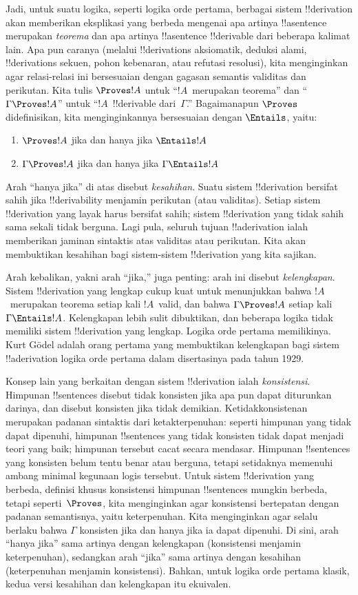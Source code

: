 \documentclass[../../../include/open-logic-section]{subfiles}
\begin{document}
Jadi, untuk suatu logika, seperti logika orde pertama, berbagai sistem
!!{derivation} akan memberikan eksplikasi yang berbeda mengenai apa
artinya !!a{sentence} merupakan \emph{teorema} dan apa artinya
!!a{sentence} !!{derivable} dari beberapa kalimat lain. Apa pun
caranya (melalui !!{derivation}s aksiomatik, deduksi alami,
!!{derivation}s sekuen, pohon kebenaran, atau refutasi resolusi), kita
menginginkan agar relasi-relasi ini bersesuaian dengan gagasan
semantis validitas dan perikutan. Kita tulis $\Proves !A$ untuk
``$!A$~merupakan teorema'' dan ``$\Gamma \Proves !A$'' untuk
``$!A$~!!{derivable} dari~$\Gamma$.'' Bagaimanapun $\Proves$~
didefinisikan, kita menginginkannya bersesuaian dengan $\Entails$,
yaitu:
\begin{enumerate}
\item $\Proves !A$ jika dan hanya jika $\Entails !A$
\item $\Gamma \Proves !A$ jika dan hanya jika $\Gamma \Entails !A$
\end{enumerate}
Arah ``hanya jika'' di atas disebut \emph{kesahihan}.
Suatu sistem !!{derivation} bersifat sahih jika !!{derivability} menjamin
perikutan (atau validitas). Setiap sistem !!{derivation} yang layak
harus bersifat sahih; sistem !!{derivation} yang tidak sahih sama
sekali tidak berguna. Lagi pula, seluruh tujuan !!a{derivation} ialah
memberikan jaminan sintaktis atas validitas atau perikutan. Kita akan
membuktikan kesahihan bagi sistem-sistem !!{derivation} yang kita
sajikan.

Arah kebalikan, yakni arah ``jika,'' juga penting: arah ini disebut
\emph{kelengkapan}. Sistem !!{derivation} yang lengkap cukup kuat
untuk menunjukkan bahwa $!A$~merupakan teorema setiap kali $!A$~valid,
dan bahwa $\Gamma \Proves !A$ setiap kali $\Gamma \Entails !A$.
Kelengkapan lebih sulit dibuktikan, dan beberapa logika tidak memiliki
sistem !!{derivation} yang lengkap. Logika orde pertama memilikinya.
Kurt G\"odel adalah orang pertama yang membuktikan kelengkapan bagi
sistem !!a{derivation} logika orde pertama dalam disertasinya pada
tahun 1929.

Konsep lain yang berkaitan dengan sistem !!{derivation} ialah
\emph{konsistensi}. Himpunan !!{sentence}s disebut tidak konsisten jika
apa pun dapat diturunkan darinya, dan disebut konsisten jika tidak
demikian. Ketidakkonsistenan merupakan padanan sintaktis dari
ketakterpenuhan: seperti himpunan yang tidak dapat dipenuhi, himpunan
!!{sentence}s yang tidak konsisten tidak dapat menjadi teori yang
baik; himpunan tersebut cacat secara mendasar. Himpunan !!{sentence}s
yang konsisten belum tentu benar atau berguna, tetapi setidaknya
memenuhi ambang minimal kegunaan logis tersebut. Untuk sistem
!!{derivation} yang berbeda, definisi khusus konsistensi himpunan
!!{sentence}s mungkin berbeda, tetapi seperti~$\Proves$, kita
menginginkan agar konsistensi bertepatan dengan padanan semantisnya,
yaitu keterpenuhan. Kita menginginkan agar selalu berlaku bahwa
$\Gamma$ konsisten jika dan hanya jika ia dapat dipenuhi. Di sini,
arah ``hanya jika'' sama artinya dengan kelengkapan (konsistensi
menjamin keterpenuhan), sedangkan arah ``jika'' sama artinya dengan
kesahihan (keterpenuhan menjamin konsistensi). Bahkan, untuk logika
orde pertama klasik, kedua versi kesahihan dan kelengkapan itu
ekuivalen.
\end{document}
